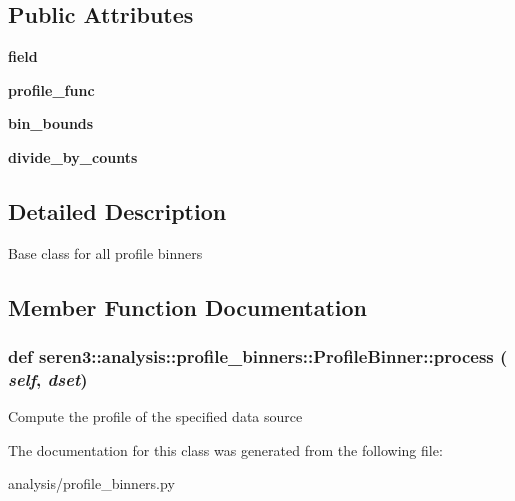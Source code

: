 \subsection*{Public Attributes}
\begin{DoxyCompactItemize}
\item 
\hypertarget{classseren3_1_1analysis_1_1profile__binners_1_1ProfileBinner_aba7bf04bad92b540fbb055ad42d286a3}{
{\bfseries field}}
\label{classseren3_1_1analysis_1_1profile__binners_1_1ProfileBinner_aba7bf04bad92b540fbb055ad42d286a3}

\item 
\hypertarget{classseren3_1_1analysis_1_1profile__binners_1_1ProfileBinner_a82c7c24f8990f7a83a31f790aed7cc76}{
{\bfseries profile\_\-func}}
\label{classseren3_1_1analysis_1_1profile__binners_1_1ProfileBinner_a82c7c24f8990f7a83a31f790aed7cc76}

\item 
\hypertarget{classseren3_1_1analysis_1_1profile__binners_1_1ProfileBinner_a99273884db40563aa3441a5d654b4ac5}{
{\bfseries bin\_\-bounds}}
\label{classseren3_1_1analysis_1_1profile__binners_1_1ProfileBinner_a99273884db40563aa3441a5d654b4ac5}

\item 
\hypertarget{classseren3_1_1analysis_1_1profile__binners_1_1ProfileBinner_a11809bfe8444bb3a389ccd7da22cfb34}{
{\bfseries divide\_\-by\_\-counts}}
\label{classseren3_1_1analysis_1_1profile__binners_1_1ProfileBinner_a11809bfe8444bb3a389ccd7da22cfb34}

\end{DoxyCompactItemize}


\subsection{Detailed Description}
\begin{DoxyVerb}
Base class for all profile binners
\end{DoxyVerb}
 

\subsection{Member Function Documentation}
\hypertarget{classseren3_1_1analysis_1_1profile__binners_1_1ProfileBinner_a69d316ad2106ccc34416d18f8dbcdac6}{
\subsubsection[{process}]{\setlength{\rightskip}{0pt plus 5cm}def seren3::analysis::profile\_\-binners::ProfileBinner::process ( {\em self}, \/   {\em dset})}}
\label{classseren3_1_1analysis_1_1profile__binners_1_1ProfileBinner_a69d316ad2106ccc34416d18f8dbcdac6}
\begin{DoxyVerb}Compute the profile of the specified data source
\end{DoxyVerb}
 

The documentation for this class was generated from the following file:\begin{DoxyCompactItemize}
\item 
analysis/profile\_\-binners.py\end{DoxyCompactItemize}
